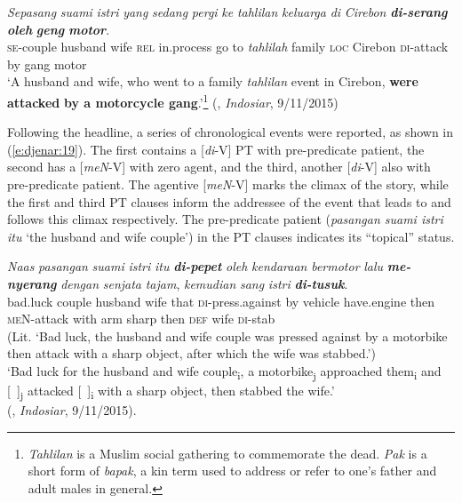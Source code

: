 \documentclass[output=paper
,modfonts
,nonflat]{langsci/langscibook}
\begin{document}
\begin{exe}
	\ex\label{e:djenar:18}
	\gll \textit{Sepasang} \textit{suami} \textit{istri} \textit{yang} \textit{sedang} \textit{pergi} \textit{ke} \textit{tahlilan} \textit{keluarga}   \textit{di} \textit{Cirebon} \textbf{\textit{di-serang}} \textbf{\textit{oleh}} \textbf{\textit{geng}} \textbf{\textit{motor}}.\\
	\textsc{se}-couple husband wife \textsc{rel} in.process go to \textit{tahlilah} family \textsc{loc} Cirebon \textsc{di}-attack by gang  motor\\
	\glt ‘A husband and wife, who went to a family \textit{tahlilan} event in Cirebon, \textbf{were attacked} \textbf{by a motorcycle gang}.’\footnote{\textit{Tahlilan} is a Muslim social gathering to commemorate the dead. \textit{Pak} is a short form of \textit{bapak}, a kin term used to address or refer to one’s father and adult males in general.}  (, \textit{Indosiar}, 9/11/2015)
\end{exe}

\noindent
Following the headline, a series of chronological events were reported, as shown in (\ref{e:djenar:19}). The first  contains a [\textit{di}-V] PT  with pre-predicate patient, the second has a [\textit{meN}-V]  with zero agent, and the third, another [\textit{di}-V]  also with pre-predicate patient. The agentive [\textit{meN}-V]  marks the climax of the story, while the first and third PT clauses inform the addressee of the event that leads to and follows this climax respectively. The pre-predicate patient (\textit{pasangan suami istri itu} ‘the husband and wife couple’) in the PT clauses indicates its “topical” status. 

\begin{exe}
	\ex\label{e:djenar:19}
	\gll \textit{Naas} \textit{pasangan} \textit{suami} \textit{istri} \textit{itu} \textbf{\textit{di-pepet}} \textit{oleh} \textit{kendaraan} \textit{bermotor} \textit{lalu} \textbf{\textit{me-nyerang}} \textit{dengan} \textit{senjata} \textit{tajam}, \textit{kemudian} \textit{sang}  \textit{istri} \textbf{\textit{di-tusuk}}.\\
	bad.luck couple husband wife that \textsc{di}-press.against by vehicle have.engine then \textsc{meN}-attack with arm sharp then \textsc{def}  wife \textsc{di}-stab\\
	(Lit. ‘Bad luck, the husband and wife couple was pressed against by a motorbike then attack with a sharp object, after which the wife was stabbed.’)\\
	\glt ‘Bad luck for the husband and wife couple\textsubscript{i}, a motorbike\textsubscript{j} approached them\textsubscript{i} and [~]\textsubscript{j} attacked [~]\textsubscript{i} with a sharp object, then stabbed the wife.’ \\\hfill{(, \textit{Indosiar}, 9/11/2015).}
\end{exe}
\end{document}

